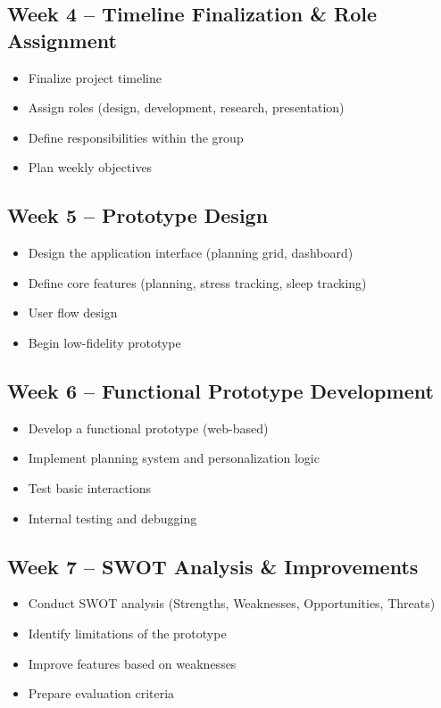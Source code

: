\documentclass{article}
\begin{document}
\subsection*{Week 4 – Timeline Finalization \& Role Assignment}
\begin{itemize}
    \item Finalize project timeline
    \item Assign roles (design, development, research, presentation)
    \item Define responsibilities within the group
    \item Plan weekly objectives
\end{itemize}

\subsection*{Week 5 – Prototype Design}
\begin{itemize}
    \item Design the application interface (planning grid, dashboard)
    \item Define core features (planning, stress tracking, sleep tracking)
    \item User flow design
    \item Begin low-fidelity prototype
\end{itemize}

\subsection*{Week 6 – Functional Prototype Development}
\begin{itemize}
    \item Develop a functional prototype (web-based)
    \item Implement planning system and personalization logic
    \item Test basic interactions
    \item Internal testing and debugging
\end{itemize}

\subsection*{Week 7 – SWOT Analysis \& Improvements}
\begin{itemize}
    \item Conduct SWOT analysis (Strengths, Weaknesses, Opportunities, Threats)
    \item Identify limitations of the prototype
    \item Improve features based on weaknesses
    \item Prepare evaluation criteria
\end{itemize}
\end{document}
